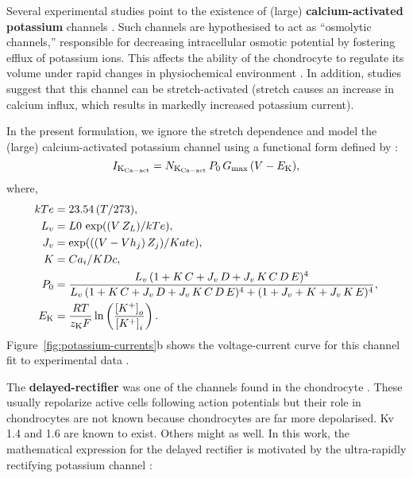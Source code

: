 Several experimental studies point to the existence of (large) {\bf
  calcium-activated potassium} channels
\citep{BarrettJolleyetal2010}. Such channels are hypothesised to act
as ``osmolytic channels,'' responsible for decreasing intracellular
osmotic potential by fostering efflux of potassium ions. This affects
the ability of the chondrocyte to regulate its volume under rapid
changes in physiochemical environment \citep{Lewisetal2011}. In
addition, studies suggest \citep{UNKNOWN} that this channel can be
stretch-activated (stretch causes an increase in calcium influx, which
results in markedly increased potassium current).

In the present formulation, we ignore the stretch dependence and model
the (large) calcium-activated potassium channel using a functional
form defined by \citet{HorriganAldrich2002}:
\begin{equation}
    I_{\rm K_{Ca-act}} = N_{\rm K_{Ca-act}}\, P_0\, G_{\rm max}\, (V -
    E_{\rm K}),
\end{equation}
where,
\begin{equation}
  \begin{split}
    kTe & = 23.54\, (T/273),\\
    L_v & = L0\, \exp((V\, Z_L)/kTe),\\
    J_v & = \exp(((V - Vh_j)\, Z_j)/Kate),\\
    K & = Ca_i/KDc,\\
    P_0 & = \frac{L_v\, (1+K\, C+J_v\, D+J_v\, K\, C\, D\, E)^4}
    {L_v\, (1+K\, C+J_v\, D+J_v\, K\, C\, D\, E)^4 +
      (1+J_v+K+J_v\, K\, E)^4},\\
    E_{\rm K} & =  \frac{R T}{z_{\rm K} F}
    \ln\left(\frac{\left[K^{+}\right]_{o}}
      {\left[K^{+}\right]_{i}}\right).
  \end{split}
\end{equation}
Figure~\ref{fig:potassium-currents}b shows the voltage-current
curve for this channel fit to experimental data
\citep{Clarketal2011}.

The {\bf delayed-rectifier} was one of the channels found in the
chondrocyte \citep{Walshetal1992, Sugimotoetal1996,
  Mobasherietal2005}. These usually repolarize active cells following
action potentials but their role in chondrocytes are not known because
chondrocytes are far more depolarised. Kv 1.4 and 1.6
\citep{Clarketal2010, Mobasherietal2005} are known to exist. Others
might as well. In this work, the mathematical expression for the
delayed rectifier is motivated by the ultra-rapidly rectifying
potassium channel \citep{Maleckaretal2009}:

